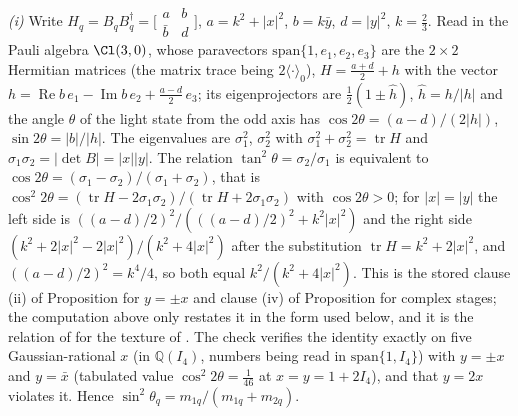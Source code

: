 \emph{(i)} Write $H_{q} = B_{q}B_{q}^{\dagger} = \bigl[\begin{smallmatrix} a & b \\ \bar{b} & d\end{smallmatrix}\bigr]$, $a = k^{2} + |x|^{2}$, $b = k\bar{y}$, $d = |y|^{2}$, $k = \tfrac23$. Read in the Pauli algebra $\Cl(3,0)$, whose paravectors $\mathrm{span}\{1, e_{1}, e_{2}, e_{3}\}$ are the $2 \times 2$ Hermitian matrices (the matrix trace being $2\langle\cdot\rangle_{0}$), $H = \tfrac{a + d}{2} + h$ with the vector $h = \operatorname{Re}b\,e_{1} - \operatorname{Im}b\,e_{2} + \tfrac{a - d}{2}\,e_{3}$; its eigenprojectors are $\tfrac12(1 \pm \hat{h})$, $\hat{h} = h/|h|$ and the angle $\theta$ of the light state from the odd axis has $\cos 2\theta = (a - d)/(2|h|)$, $\sin 2\theta = |b|/|h|$. The eigenvalues are $\sigma_{1}^{2}$, $\sigma_{2}^{2}$ with $\sigma_{1}^{2} + \sigma_{2}^{2} = \operatorname{tr}H$ and $\sigma_{1}\sigma_{2} = |\det B| = |x||y|$. The relation $\tan^{2}\theta = \sigma_{2}/\sigma_{1}$ is equivalent to $\cos 2\theta = (\sigma_{1} - \sigma_{2})/(\sigma_{1} + \sigma_{2})$, that is $\cos^{2}2\theta = (\operatorname{tr}H - 2\sigma_{1}\sigma_{2})/(\operatorname{tr}H + 2\sigma_{1}\sigma_{2})$ with $\cos 2\theta > 0$; for $|x| = |y|$ the left side is $((a - d)/2)^{2}/(((a - d)/2)^{2} + k^{2}|x|^{2})$ and the right side $(k^{2} + 2|x|^{2} - 2|x|^{2})/(k^{2} + 4|x|^{2})$ after the substitution $\operatorname{tr}H = k^{2} + 2|x|^{2}$, and $((a - d)/2)^{2} = k^{4}/4$, so both equal $k^{2}/(k^{2} + 4|x|^{2})$. This is the stored clause (ii) of Proposition  for $y = \pm x$ and clause (iv) of Proposition  for complex stages; the computation above only restates it in the form used below, and it is the relation of \cite{GST1968} for the texture of \cite{Fritzsch1978}. The check verifies the identity exactly on five Gaussian-rational $x$ (in $\mathbb{Q}(I_4)$, numbers being read in $\mathrm{span}\{1, I_4\}$) with $y = \pm x$ and $y = \bar{x}$ (tabulated value $\cos^{2}2\theta = \tfrac{1}{46}$ at $x = y = 1 + 2I_4$), and that $y = 2x$ violates it. Hence $\sin^{2}\theta_{q} = m_{1q}/(m_{1q} + m_{2q})$.

